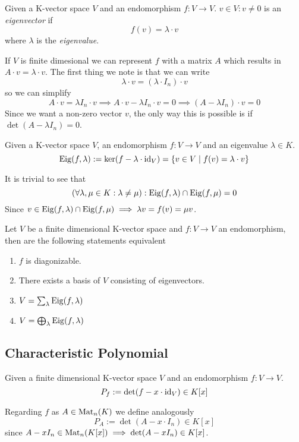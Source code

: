 \begin{definition}
   Given a K-vector space \(V\) and an endomorphism \(f: V \to V\).
   \(v \in V: v \neq 0\) is an \textit{eigenvector} if
   \[f(v) = \lambda \cdot v\]
   where \(\lambda\) is the \textit{eigenvalue}.
\end{definition}
\begin{remark}
   If \(V\) is finite dimesional we can represent \(f\) with a matrix \(A\) which results in \(A \cdot v = \lambda \cdot v\).
   The first thing we note is that we can write
   \[\lambda \cdot v = (\lambda \cdot I_n) \cdot v\]
   so we can simplify
   \[A \cdot v = \lambda I_n \cdot v \implies A \cdot v - \lambda I_n \cdot v = 0 \implies (A - \lambda I_n) \cdot v = 0\]
   Since we want a non-zero vector \(v\), the only way this is possible is if \(\det(A - \lambda I_n) = 0\).
\end{remark}

\begin{definition}[Eigenspace]
   Given a K-vector space \(V\), an endomorphism \(f: V \to V\) and an eigenvalue \(\lambda \in K\).
   \[\operatorname{Eig}(f, \lambda) := \ker(f - \lambda \cdot \operatorname{id}_V) = \{v \in V \mid f(v) = \lambda \cdot v\}\]
\end{definition}
\begin{remark}
   It is trivial to see that
   \[(\forall \lambda, \mu \in K: \lambda \neq \mu): \operatorname{Eig}(f, \lambda) \cap \operatorname{Eig}(f, \mu) = 0\]
   Since \(v \in \operatorname{Eig}(f, \lambda) \cap \operatorname{Eig}(f, \mu) \implies \lambda v = f(v) = \mu v\).
\end{remark}

\begin{proposition}
   Let \(V\) be a finite dimensional K-vector space and \(f: V \to V\) an endomorphism, then are the following statements equivalent
   \begin{enumerate}[label=\roman*, align=Center]
      \item \(f\) is diagonizable.
      \item There exists a basis of \(V\) consisting of eigenvectors.
      \item \(V = \sum_{\lambda} \operatorname{Eig}(f, \lambda)\)
      \item \(V = \bigoplus_{\lambda} \operatorname{Eig}(f, \lambda)\)
   \end{enumerate}
\end{proposition}

\subsection{Characteristic Polynomial}
\begin{definition}
   Given a finite dimensional K-vector space \(V\) and an endomorphism \(f: V \to V\).
   \[P_f := \det(f - x \cdot \operatorname{id}_V) \in K[x]\]
\end{definition}
\begin{remark}
   Regarding \(f\) as \(A \in \operatorname{Mat}_n(K)\) we define analogously
   \[P_A := \det(A - x \cdot I_n) \in K[x]\]
   since \(A - x I_n \in \operatorname{Mat}_n(K[x]) \implies \det(A - x I_n) \in K[x]\).
\end{remark}

